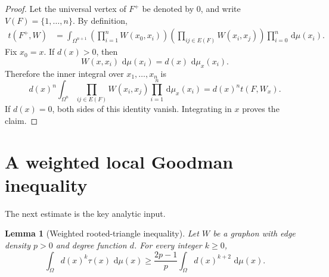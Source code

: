 \documentclass[11pt]{article}
\newtheorem{lemma}[theorem]{Lemma}
\newcommand{\1}{\mathbf{1}}
\newcommand{\dd}{\,\mathrm{d}}
\begin{document}
\begin{proof}
Let the universal vertex of $F^+$ be denoted by $0$, and write
$V(F)=\{1,\dots,n\}$.  By definition,
\begin{align*}
t(F^+,W)
&=
\int_{\Omega^{n+1}}
\left(
\prod_{i=1}^n W(x_0,x_i)
\right)
\left(
\prod_{ij\in E(F)}W(x_i,x_j)
\right)
\prod_{i=0}^n\dd\mu(x_i).
\end{align*}
Fix $x_0=x$.  If $d(x)>0$, then
\[
W(x,x_i)\,\dd\mu(x_i)
=
d(x)\,\dd\mu_x(x_i).
\]
Therefore the inner integral over $x_1,\dots,x_n$ is
\[
d(x)^n
\int_{\Omega^n}
\prod_{ij\in E(F)}W(x_i,x_j)
\prod_{i=1}^n\dd\mu_x(x_i)
=
d(x)^n t(F,W_x).
\]
If $d(x)=0$, both sides of this identity vanish.  Integrating in $x$
proves the claim.
\end{proof}


\section{A weighted local Goodman inequality}

The next estimate is the key analytic input.

\begin{lemma}[Weighted rooted-triangle inequality]
\label{lem:weighted-local-goodman}
Let $W$ be a graphon with edge density $p>0$ and degree function $d$.
For every integer $k\ge 0$,
\[
\boxed{
\int_\Omega d(x)^k\tau(x)\,\dd\mu(x)
\ge
\frac{2p-1}{p}
\int_\Omega d(x)^{k+2}\,\dd\mu(x).
}
\]
\end{lemma}
\end{document}
